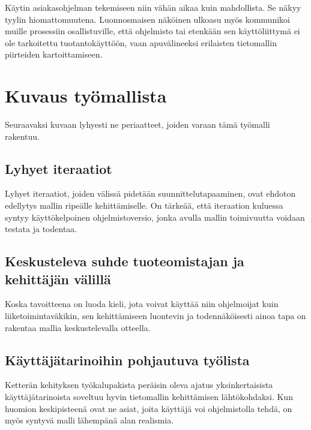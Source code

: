 Käytin asiakasohjelman tekemiseen niin vähän aikaa kuin mahdollista. Se
näkyy tyylin hiomattomuutena. Luonnosmaisen näköinen ulkoasu myös
kommunikoi muille prosessiin osallistuville, että ohjelmisto tai
etenkään sen käyttöliittymä ei ole tarkoitettu tuotantokäyttöön, vaan
apuvälineeksi erilaisten tietomallin piirteiden kartoittamiseen.

\hypertarget{kuvaus-tyuxf6mallista}{%
\section{Kuvaus työmallista}\label{kuvaus-tyuxf6mallista}}

Seuraavaksi kuvaan lyhyesti ne periaatteet, joiden varaan tämä työmalli
rakentuu.

\hypertarget{lyhyet-iteraatiot}{%
\subsection{Lyhyet iteraatiot}\label{lyhyet-iteraatiot}}

Lyhyet iteraatiot, joiden välissä pidetään suunnittelutapaaminen, ovat
ehdoton edellytys mallin ripeälle kehittämiselle. On tärkeää, että
iteraation kuluessa syntyy käyttökelpoinen ohjelmistoversio, jonka
avulla mallin toimivuutta voidaan testata ja todentaa.

\hypertarget{keskusteleva-suhde-tuoteomistajan-ja-kehittuxe4juxe4n-vuxe4lilluxe4}{%
\subsection{Keskusteleva suhde tuoteomistajan ja kehittäjän
välillä}\label{keskusteleva-suhde-tuoteomistajan-ja-kehittuxe4juxe4n-vuxe4lilluxe4}}

Koska tavoitteena on luoda kieli, jota voivat käyttää niin ohjelmoijat
kuin liiketoimintaväkikin, sen kehittämiseen luontevin ja
todennäköisesti ainoa tapa on rakentaa mallia keskustelevalla otteella.

\hypertarget{kuxe4yttuxe4juxe4tarinoihin-pohjautuva-tyuxf6lista}{%
\subsection{Käyttäjätarinoihin pohjautuva
työlista}\label{kuxe4yttuxe4juxe4tarinoihin-pohjautuva-tyuxf6lista}}

Ketterän kehityksen työkalupakista peräisin oleva ajatus
yksinkertaisista käyttäjätarinoista soveltuu hyvin tietomallin
kehittämisen lähtökohdaksi. Kun huomion keskipisteenä ovat ne asiat,
joita käyttäjä voi ohjelmistolla tehdä, on myös syntyvä malli lähempänä
alan realismia.

